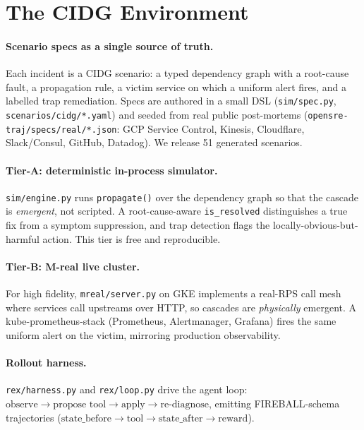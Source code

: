 \section{The CIDG Environment}
\label{sec:env}

\paragraph{Scenario specs as a single source of truth.}
Each incident is a CIDG scenario: a typed dependency graph with a root-cause fault, a
propagation rule, a victim service on which a uniform alert fires, and a labelled trap
remediation. Specs are authored in a small DSL (\texttt{sim/spec.py},
\texttt{scenarios/cidg/*.yaml}) and seeded from real public post-mortems
(\texttt{opensre-traj/specs/real/*.json}: GCP Service Control, Kinesis, Cloudflare,
Slack/Consul, GitHub, Datadog). We release 51 generated scenarios.

\paragraph{Tier-A: deterministic in-process simulator.}
\texttt{sim/engine.py} runs \texttt{propagate()} over the dependency graph so that the cascade
is \emph{emergent}, not scripted. A root-cause-aware \texttt{is\_resolved} distinguishes a
true fix from a symptom suppression, and trap detection flags the locally-obvious-but-harmful
action. This tier is free and reproducible.

\paragraph{Tier-B: M-real live cluster.}
For high fidelity, \texttt{mreal/server.py} on GKE implements a real-RPS call mesh where
services call upstreams over HTTP, so cascades are \emph{physically} emergent. A
kube-prometheus-stack (Prometheus, Alertmanager, Grafana) fires the same uniform alert on the
victim, mirroring production observability.

\paragraph{Rollout harness.}
\texttt{rex/harness.py} and \texttt{rex/loop.py} drive the agent loop:
\(\text{observe} \rightarrow \text{propose tool} \rightarrow \text{apply} \rightarrow
\text{re-diagnose}\), emitting FIREBALL-schema trajectories
(\(\text{state\_before} \rightarrow \text{tool} \rightarrow \text{state\_after} \rightarrow
\text{reward}\)).
